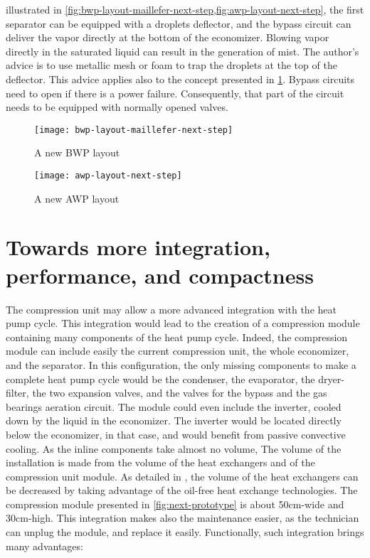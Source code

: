 illustrated in
\cref{fig:bwp-layout-maillefer-next-step,fig:awp-layout-next-step},
the first separator can be equipped with a droplets
deflector, and the bypass circuit can deliver
the vapor directly at the bottom of the economizer. Blowing vapor
directly in the saturated liquid can result in the generation of
mist. The author's advice is to use metallic mesh or foam to trap the
droplets at the top of the deflector. This advice applies also to the
concept presented in \cref{sec:next-topology}. Bypass circuits need to
open if there is a power failure. Consequently, that part of the
circuit needs to be equipped with normally opened valves.

\begin{figure}[htbp]
  \centering
  \texttt{[image: bwp-layout-maillefer-next-step]}
  \caption[Proposal for a new BWP layout]
  {A new BWP layout}
  \label{fig:bwp-layout-maillefer-next-step}
\end{figure}

\begin{figure}[htbp]
  \centering
  \texttt{[image: awp-layout-next-step]}
  \caption[Proposal for a new AWP layout]
  {A new AWP layout}
  \label{fig:awp-layout-next-step}
\end{figure}

\section{Towards more integration, performance,
  and compactness}
\label{sec:next-topology}

The compression unit may allow a more advanced integration with the
heat pump cycle. This integration would lead to the creation of a
compression module containing many components of the heat pump
cycle. Indeed, the compression module can include easily the current
compression unit, the whole economizer, and the separator. In this
configuration, the only missing components to make a complete heat
pump cycle would be the condenser, the evaporator, the dryer-filter,
the two expansion valves, and the valves for the bypass and the gas
bearings aeration circuit. The module could even include the inverter,
cooled down by the liquid in the economizer. The inverter would be
located directly below the economizer, in that case, and would benefit
from passive convective cooling. As the inline components take almost
no volume, The volume of the installation is made from the volume of
the heat exchangers and of the compression unit module. As detailed in
, the volume of the heat exchangers can be
decreased by taking advantage of the oil-free heat exchange
technologies. The compression module presented in
\cref{fig:next-prototype} is about 50cm-wide and 30cm-high. This
integration makes also the maintenance easier, as the technician can
unplug the module, and replace it easily. Functionally, such
integration brings many advantages:


